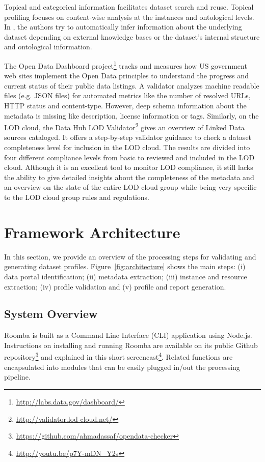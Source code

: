 \documentclass{sig-alternate}
\begin{document}
Topical and categorical information facilitates dataset search and reuse. Topical profiling focuses on content-wise analysis at the instances and ontological levels. In \cite{6690016,Bohm:2012:LTG:2396761.2398718,scalableApproach}, the authors try to automatically infer information about the underlying dataset depending on external knowledge bases or the dataset's internal structure and ontological information.

The Open Data Dashboard project\footnote{\url{http://labs.data.gov/dashboard/}} tracks and measures how US government web sites implement the Open Data principles to understand the progress and current status of their public data listings. A validator analyzes machine readable files (e.g. JSON files) for automated metrics like the number of resolved URLs, HTTP status and content-type. However, deep schema information about the metadata is missing like description, license information or tags. Similarly, on the LOD cloud, the Data Hub LOD Validator\footnote{\url{http://validator.lod-cloud.net/}} gives an overview of Linked Data sources cataloged. It offers a step-by-step validator guidance to check a dataset completeness level for inclusion in the LOD cloud. The results are divided into four different compliance levels from basic to reviewed and included in the LOD cloud. Although it is an excellent tool to monitor LOD compliance, it still lacks the ability to give detailed insights about the completeness of the metadata and an overview on the state of the entire LOD cloud group while being very specific to the LOD cloud group rules and regulations.


\section{Framework Architecture}
\label{sec:framework}
In this section, we provide an overview of the processing steps for validating and generating dataset profiles. Figure~\ref{fig:architecture} shows the main steps: (i) data portal identification; (ii) metadata extraction; (iii) instance and resource extraction; (iv) profile validation and (v) profile and report generation.

\subsection{System Overview}
Roomba is built as a Command Line Interface (CLI) application using Node.js. Instructions on installing and running Roomba are available on its public Github repository\footnote{\url{https://github.com/ahmadassaf/opendata-checker}} and explained in this short screencast\footnote{\url{http://youtu.be/p7Y-mDN_Y2s}}. Related functions are encapsulated into modules that can be easily plugged in/out the processing pipeline.
\end{document}
